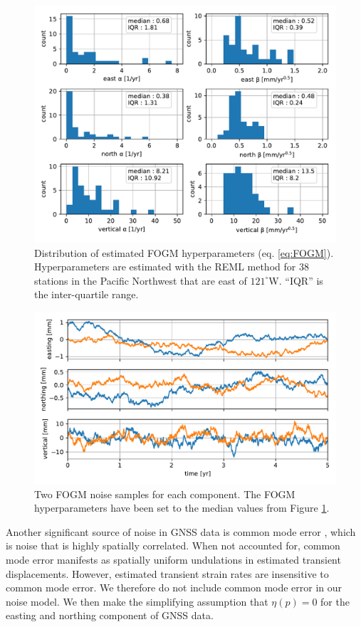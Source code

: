 \documentclass[extra,mreferee]{gji}
\begin{document}
\begin{figure}
\includegraphics{figures/noise/noise-params.pdf}
\caption{Distribution of estimated FOGM hyperparameters (eq. \ref{eq:FOGM}). Hyperparameters are estimated with the REML method for 38 stations in the Pacific Northwest that are east of $121^\circ$W. ``IQR'' is the inter-quartile range.}   
\label{fig:NoiseParams}
\end{figure}

\begin{figure}
\includegraphics{figures/noise/noise-samples.pdf}
\caption{Two FOGM noise samples for each component. The FOGM hyperparameters have been set to the median values from Figure \ref{fig:NoiseParams}.}   
\label{fig:NoiseSamples}
\end{figure}

Another significant source of noise in GNSS data is common mode error \citep[e.g.,][]{Wdowinski1997,Dong2006}, which is noise that is highly spatially correlated. When not accounted for, common mode error manifests as spatially uniform undulations in estimated transient displacements. However, estimated transient strain rates are insensitive to common mode error. We therefore do not include common mode error in our noise model. We then make the simplifying assumption that $\eta(p) = 0$ for the easting and northing component of GNSS data.  
\end{document}
